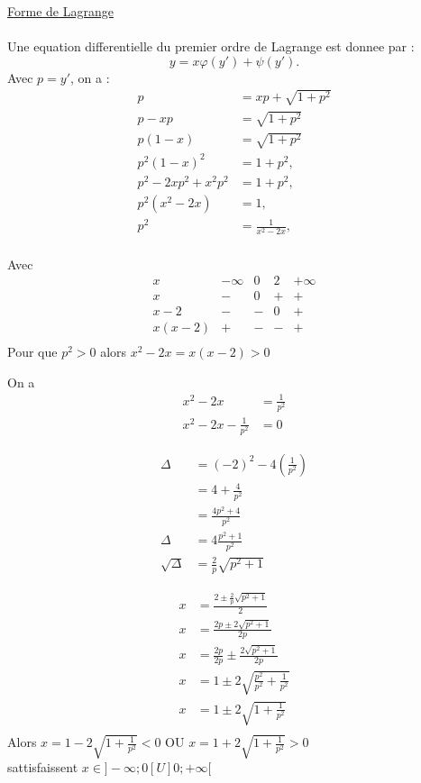 \underline{Forme de Lagrange} \\ \\
Une equation differentielle du premier ordre de Lagrange est donnee par :
\begin{equation}
    y = x \varphi(y') + \psi(y').
\end{equation}
Avec $p = y'$, on a :
\begin{align*}
    p &= x p + \sqrt{1 + p^2} \\
    p - x p &= \sqrt{1 + p^2} \\
    p (1 - x) &= \sqrt{1 + p^2} \\
    p^2 (1 - x)^2 &= 1 + p^2, \\
    p^2 - 2x p^2 + x^2 p^2 &= 1 + p^2, \\
    p^2 (x^2 - 2x) &= 1, \\
    p^2 &= \frac{1}{x^2 - 2x}, \\
\end{align*}

Avec
\[
\begin{array}{c|c|c|c|c}
    x & -\infty & 0 & 2 & +\infty \\
    \hline
    x & - & 0 & + & + \\
    \hline
    x - 2 & - & - & 0 & + \\
    \hline
    x(x-2) & + & - & - & + \\
\end{array}
\]
Pour que $p^2 > 0$ alors $x^2-2x = x(x-2) > 0$

On a
\begin{align*}
    x^2 -2x &= \frac{1}{p^2} \\
    x^2 -2x - \frac{1}{p^2} &= 0
\end{align*}

\begin{align*}
    \Delta &= (-2)^2 - 4 (\frac{1}{p^2}) \\
    &= 4 + \frac{4}{p^2} \\
    &= \frac{4p^2+4}{p^2} \\ 
    \Delta &= 4\frac{p^2 +1}{p^2} \\
    \sqrt\Delta &= \frac{2}{p}\sqrt{p^2+1}
\end{align*}

\begin{align*}
    x &= \frac{2 \pm \frac{2}{p}\sqrt{p^2+1} }{2} \\
    x &= \frac{2p \pm 2\sqrt{p^2+1}}{2p} \\
    x &= \frac{2p}{2p} \pm \frac{2\sqrt{p^2+1}}{2p} \\
    x &= 1 \pm 2\sqrt{ \frac{p^2}{p^2} + \frac{1}{p^2} } \\
    x &= 1 \pm 2\sqrt{ 1 + \frac{1}{p^2} } \\
\end{align*}
Alors  $x = 1 - 2\sqrt{ 1 + \frac{1}{p^2} } < 0 $ OU $x = 1 + 2\sqrt{ 1 + \frac{1}{p^2} } > 0$ \\
sattisfaissent $x \in ]-\infty; 0[ U ]0; + \infty[$

